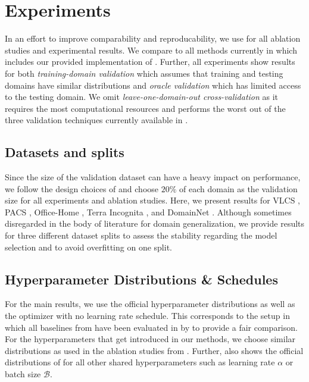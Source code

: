 \chapter{Experiments}
In an effort to improve comparability and reproducability, we use \domainbed \citep{gulrajani2020search} for all ablation studies and experimental results. We compare to all methods currently in \domainbed which includes our provided implementation of \rsc. Further, all experiments show results for both \emph{training-domain validation} which assumes that training and testing domains have similar distributions  and \emph{oracle validation} which has limited access to the testing domain. We omit \emph{leave-one-domain-out cross-validation} as it requires the most computational resources and performs the worst out of the three validation techniques currently available in \domainbed \citep{gulrajani2020search}.

\section{Datasets and splits}
Since the size of the validation dataset can have a heavy impact on performance, we follow the design choices of \domainbed and choose $20\%$ of each domain as the validation size for all experiments and ablation studies. Here, we present results for VLCS \citep{FangXR13}, PACS \citep{LiYSH17}, Office-Home \citep{VenkateswaraECP17}, Terra Incognita \citep{BeeryHP18}, and DomainNet \citep{PengBXHSW19}. Although sometimes disregarded in the body of literature for domain generalization, we provide results for three different dataset splits to assess the stability regarding the model selection and to avoid overfitting on one split. 

\section{Hyperparameter Distributions \& Schedules}
For the main results, we use the official \domainbed hyperparameter distributions as well as the \adam optimizer with no learning rate schedule. This corresponds to the setup in which all baselines from  have been evaluated in by \citet{gulrajani2020search} to provide a fair comparison. For the hyperparameters that get introduced in our methods, we choose similar distributions as used in the ablation studies from . Further,  also shows the official distributions of \domainbed for all other shared hyperparameters such as learning rate $\alpha$ or batch size $\mathcal{B}$.

